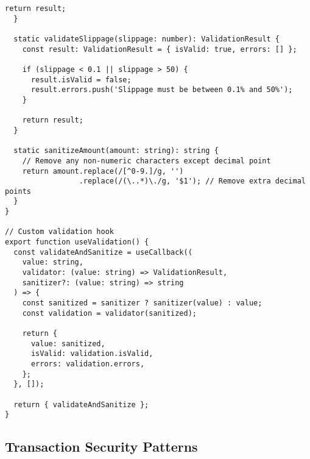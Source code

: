 \documentclass[11pt,a4paper]{article}
\begin{document}
\begin{lstlisting}[style=typescript, caption=Comprehensive Input Validation]
    return result;
  }
  
  static validateSlippage(slippage: number): ValidationResult {
    const result: ValidationResult = { isValid: true, errors: [] };
    
    if (slippage < 0.1 || slippage > 50) {
      result.isValid = false;
      result.errors.push('Slippage must be between 0.1% and 50%');
    }
    
    return result;
  }
  
  static sanitizeAmount(amount: string): string {
    // Remove any non-numeric characters except decimal point
    return amount.replace(/[^0-9.]/g, '')
                 .replace(/(\..*)\./g, '$1'); // Remove extra decimal points
  }
}

// Custom validation hook
export function useValidation() {
  const validateAndSanitize = useCallback((
    value: string,
    validator: (value: string) => ValidationResult,
    sanitizer?: (value: string) => string
  ) => {
    const sanitized = sanitizer ? sanitizer(value) : value;
    const validation = validator(sanitized);
    
    return {
      value: sanitized,
      isValid: validation.isValid,
      errors: validation.errors,
    };
  }, []);
  
  return { validateAndSanitize };
}
\end{lstlisting}

\subsection{Transaction Security Patterns}
\end{document}
